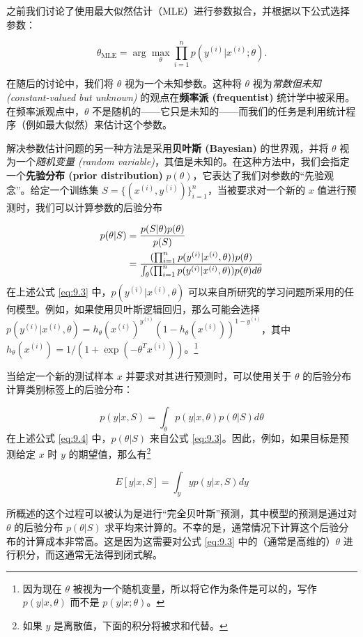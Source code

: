 之前我们讨论了使用最大似然估计（MLE）进行参数拟合，并根据以下公式选择参数：

\[
    \theta_{\text{MLE}} = \arg \max_\theta \prod_{i=1}^n p(y^{(i)} | x^{(i)}; \theta).
\]

在随后的讨论中，我们将 $\theta$ 视为一个未知参数。这种将 $\theta$ 视为\textit{常数但未知 (constant-valued but unknown)} 的观点在\textbf{频率派 (frequentist)} 统计学中被采用。在频率派观点中，$\theta$ 不是随机的——它只是未知的——而我们的任务是利用统计程序（例如最大似然）来估计这个参数。

解决参数估计问题的另一种方法是采用\textbf{贝叶斯 (Bayesian)} 的世界观，并将 $\theta$ 视为一个\textit{随机变量 (random
variable)}，其值是未知的。在这种方法中，我们会指定一个\textbf{先验分布 (prior distribution)} $p(\theta)$，它表达了我们对参数的“先验观念”。给定一个训练集 $S = \{(x^{(i)}, y^{(i)})\}_{i=1}^n$，当被要求对一个新的 $x$ 值进行预测时，我们可以计算参数的后验分布

\begin{align}
    p(\theta | S) &= \frac{p(S | \theta) p(\theta)}{p(S)} \notag \\
    &= \frac{(\prod_{i=1}^n p(y^{(i)} | x^{(i)}, \theta)) p(\theta)}{\int_\theta (\prod_{i=1}^n p(y^{(i)} | x^{(i)}, \theta)) p(\theta) d\theta} \label{eq:9.3}
\end{align}
在上述公式 \eqref{eq:9.3} 中，$p(y^{(i)} | x^{(i)}, \theta)$ 可以来自所研究的学习问题所采用的任何模型。例如，如果使用贝叶斯逻辑回归，那么可能会选择 $p(y^{(i)}|x^{(i)}, \theta) = h_\theta(x^{(i)})^{y^{(i)}} (1-h_\theta(x^{(i)}))^{1-y^{(i)}}$，其中 $h_\theta(x^{(i)}) = 1/(1 + \exp(-\theta^T x^{(i)}))$。\footnote{因为现在 $\theta$ 被视为一个随机变量，所以将它作为条件是可以的，写作 $p(y|x, \theta)$ 而不是 $p(y|x; \theta)$。}

当给定一个新的测试样本 $x$ 并要求对其进行预测时，可以使用关于 $\theta$ 的后验分布计算类别标签上的后验分布：

\begin{equation}
    p(y|x, S) = \int_\theta p(y|x, \theta) p(\theta|S) d\theta
    \label{eq:9.4}
\end{equation}
在上述公式 \eqref{eq:9.4} 中，$p(\theta|S)$ 来自公式 \eqref{eq:9.3}。因此，例如，如果目标是预测给定 $x$ 时 $y$ 的期望值，那么有\footnote{如果 $y$ 是离散值，下面的积分将被求和代替。}

\[    
    E[y|x, S] = \int_y y p(y|x, S) dy
\]

所概述的这个过程可以被认为是进行“完全贝叶斯”预测，其中模型的预测是通过对 $\theta$ 的后验分布 $p(\theta|S)$ 求平均来计算的。不幸的是，通常情况下计算这个后验分布的计算成本非常高。这是因为这需要对公式 \eqref{eq:9.3} 中的（通常是高维的）$\theta$ 进行积分，而这通常无法得到闭式解。

